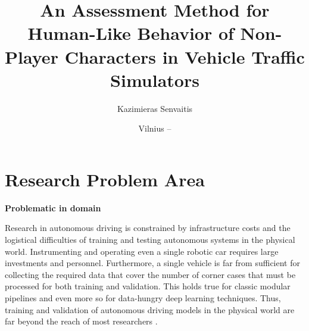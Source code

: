 \documentclass{VUMIFPS-master-intro}
\title{An Assessment Method for Human-Like Behavior of Non-Player Characters in Vehicle Traffic Simulators}
\author{Kazimieras Senvaitis}
\date{Vilnius – \the\year}
\begin{document}
\maketitle




\section{Research Problem Area}

\textbf{Problematic in domain}

Research in autonomous driving is constrained by infrastructure costs and the logistical difficulties of training and testing autonomous systems in the physical world. Instrumenting and operating even a single robotic car requires large investments and personnel. Furthermore, a single vehicle is far from sufficient for collecting the required data that cover the number of corner cases that must be processed for both training and validation. This holds true for classic modular pipelines and even more so for data-hungry deep learning techniques. Thus, training and validation of autonomous driving models in the physical world are far beyond the reach of most researchers \cite{Dosovitskiy2017}. 


\end{document}
